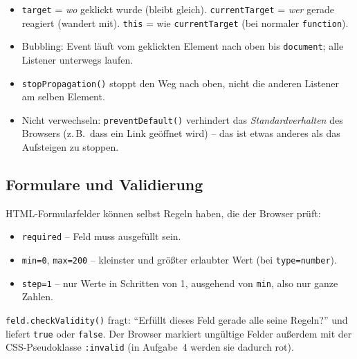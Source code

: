 \documentclass[a4paper,11pt]{article}
\begin{document}
\begin{merkbox}
\begin{itemize}[nosep]
\item \texttt{target} = \emph{wo} geklickt wurde (bleibt gleich). \texttt{currentTarget} = \emph{wer} gerade
      reagiert (wandert mit). \texttt{this} = wie \texttt{currentTarget} (bei normaler \texttt{function}).
\item Bubbling: Event läuft vom geklickten Element nach oben bis \texttt{document}; alle Listener unterwegs laufen.
\item \texttt{stopPropagation()} stoppt den Weg nach oben, nicht die anderen Listener am selben Element.
\item Nicht verwechseln: \texttt{preventDefault()} verhindert das \emph{Standardverhalten} des Browsers (z.\,B.\
      dass ein Link geöffnet wird) -- das ist etwas anderes als das Aufsteigen zu stoppen.
\end{itemize}
\end{merkbox}

\subsection{Formulare und Validierung}\label{sec:formulare}

HTML-Formularfelder können selbst Regeln haben, die der Browser prüft:
\begin{itemize}[nosep]
\item \texttt{required} -- Feld muss ausgefüllt sein.
\item \texttt{min=\textquotedbl{}0\textquotedbl{}}, \texttt{max=\textquotedbl{}200\textquotedbl{}} -- kleinster und größter erlaubter Wert (bei \texttt{type=\textquotedbl{}number\textquotedbl{}}).
\item \texttt{step=\textquotedbl{}1\textquotedbl{}} -- nur Werte in Schritten von 1, ausgehend von \texttt{min}, also nur ganze Zahlen.
\end{itemize}

\lstinline|feld.checkValidity()| fragt: "`Erfüllt dieses Feld gerade alle seine Regeln?"' und liefert
\lstinline|true| oder \lstinline|false|. Der Browser markiert ungültige Felder außerdem mit der CSS-Pseudoklasse
\texttt{:invalid} (in Aufgabe~4 werden sie dadurch rot).
\end{document}
